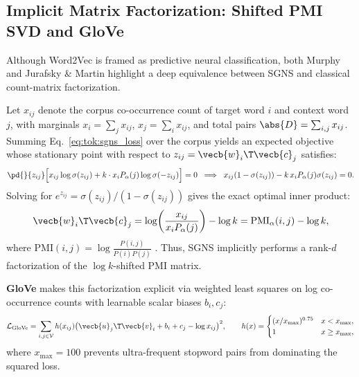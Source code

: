 \documentclass[../../../../master.tex]{subfiles}
\begin{document}
\subsection{Implicit Matrix Factorization: Shifted PMI SVD and GloVe}

Although Word2Vec is framed as predictive neural classification, both Murphy  and Jurafsky \& Martin  highlight a deep equivalence between SGNS and classical count-matrix factorization.

\begin{coremath}
Let $x_{ij}$ denote the corpus co-occurrence count of target word $i$ and context word $j$, with marginals $x_i = \sum_j x_{ij}$, $x_j = \sum_i x_{ij}$, and total pairs $\abs{D} = \sum_{i,j} x_{ij}$. Summing Eq.~\eqref{eq:tok:sgns_loss} over the corpus yields an expected objective whose stationary point with respect to $z_{ij} = \vecb{w}_i\T \vecb{c}_j$ satisfies:
\begin{equation}
  \pd{}{z_{ij}} \Bigl[ x_{ij}\log\sigma(z_{ij}) + k \cdot x_i P_\alpha(j) \log\sigma(-z_{ij}) \Bigr] = 0
  \;\implies\;
  x_{ij}(1 - \sigma(z_{ij})) - k\, x_i P_\alpha(j)\sigma(z_{ij}) = 0.
\end{equation}
Solving for $e^{z_{ij}} = \sigma(z_{ij}) / (1 - \sigma(z_{ij}))$ gives the exact optimal inner product:
\begin{equation}
  \vecb{w}_i\T \vecb{c}_j = \log\!\left(\frac{x_{ij}}{x_i P_\alpha(j)}\right) - \log k = \mathrm{PMI}_\alpha(i, j) - \log k,
  \label{eq:tok:shifted_pmi}
\end{equation}
where $\mathrm{PMI}(i, j) = \log \frac{P(i,j)}{P(i)P(j)}$ . Thus, SGNS implicitly performs a rank-$d$ factorization of the $\log k$-shifted PMI matrix.

\textbf{GloVe}  makes this factorization explicit via weighted least squares on log co-occurrence counts with learnable scalar biases $b_i, c_j$:
\begin{equation}
  \mathcal{L}_{\mathrm{GloVe}} = \sum_{i,j \in \mathcal{V}} h(x_{ij})\bigl(\vecb{u}_j\T \vecb{v}_i + b_i + c_j - \log x_{ij}\bigr)^2, \qquad
  h(x) = \begin{cases} (x/x_{\max})^{0.75} & x < x_{\max}, \\ 1 & x \ge x_{\max}, \end{cases}
  \label{eq:tok:glove}
\end{equation}
where $x_{\max} = 100$ prevents ultra-frequent stopword pairs from dominating the squared loss.
\end{coremath}
\end{document}
